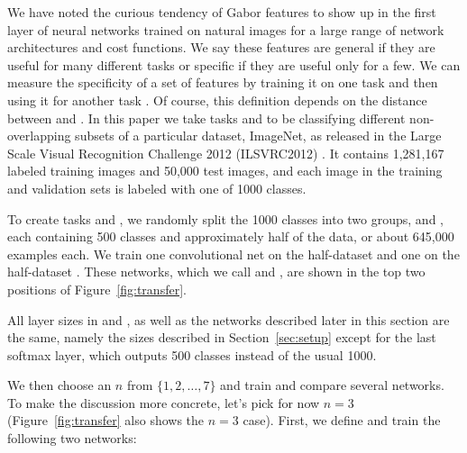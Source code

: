 We have noted the curious tendency of Gabor features to show up in the first layer of neural networks trained on natural images for a large range of network architectures and cost functions. We say these features are general if they are useful for many different tasks or specific if they are useful only for a few. We can measure the specificity of a set of features by training it on one task \dA and then using it for another task \dB.
Of course, this definition depends on the distance between \dA and \dB. In this paper we take tasks \dA and \dB to be classifying different non-overlapping subsets of a particular dataset,
ImageNet, as released in the Large Scale Visual Recognition Challenge 2012 (ILSVRC2012) \citep{imagenet_cvpr09}. It contains 1,281,167 labeled training images and 50,000 test images, and each image in the training and validation sets is labeled with one of 1000 classes.

To create tasks \dA and \dB, we randomly split the 1000 classes into two groups, \dA and \dB, each containing 500 classes and approximately half of the data, or about 645,000 examples each. We train one convolutional net on the half-dataset \dA and one on the half-dataset \dB. These networks, which we call  and , are shown in the top two positions of Figure~\ref{fig:transfer}.

All layer sizes in  and , as well as the networks described later in this section are the same, namely the sizes described in Section~\ref{sec:setup} except for the last softmax layer, which outputs 500 classes instead of the usual 1000.


We then choose an $n$ from $\{1, 2, \ldots, 7\}$ and train and compare several networks. To make the discussion more concrete, let's pick for now $n=3$ (Figure~\ref{fig:transfer} also shows the $n=3$ case).
First, we define and train the following two networks:

